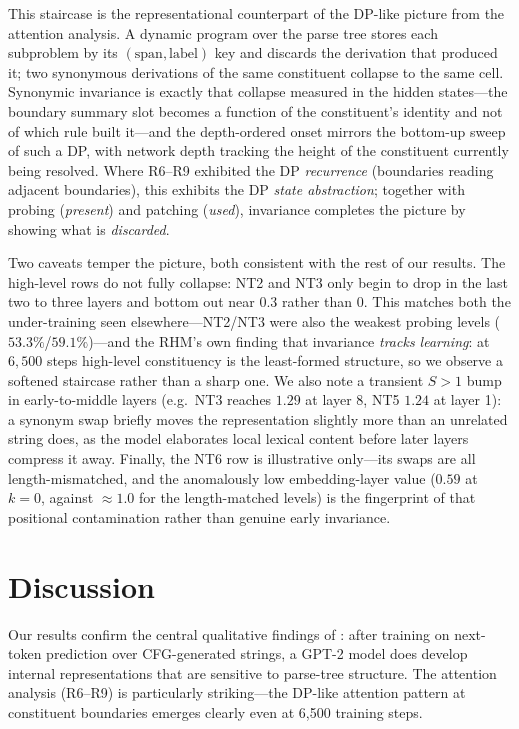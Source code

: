 \documentclass[10pt,twocolumn]{article}
\begin{document}
This staircase is the representational counterpart of the DP-like picture from the attention analysis. A dynamic program over the parse tree stores each subproblem by its $(\text{span},\text{label})$ key and discards the derivation that produced it; two synonymous derivations of the same constituent collapse to the same cell. Synonymic invariance is exactly that collapse measured in the hidden states---the boundary summary slot becomes a function of the constituent's identity and not of which rule built it---and the depth-ordered onset mirrors the bottom-up sweep of such a DP, with network depth tracking the height of the constituent currently being resolved. Where R6--R9 exhibited the DP \emph{recurrence} (boundaries reading adjacent boundaries), this exhibits the DP \emph{state abstraction}; together with probing (\emph{present}) and patching (\emph{used}), invariance completes the picture by showing what is \emph{discarded}.

Two caveats temper the picture, both consistent with the rest of our results. The high-level rows do not fully collapse: NT2 and NT3 only begin to drop in the last two to three layers and bottom out near $0.3$ rather than $0$. This matches both the under-training seen elsewhere---NT2/NT3 were also the weakest probing levels ($53.3\%$/$59.1\%$)---and the RHM's own finding that invariance \emph{tracks learning}: at $6{,}500$ steps high-level constituency is the least-formed structure, so we observe a softened staircase rather than a sharp one. We also note a transient $S>1$ bump in early-to-middle layers (e.g.\ NT3 reaches $1.29$ at layer 8, NT5 $1.24$ at layer 1): a synonym swap briefly moves the representation slightly more than an unrelated string does, as the model elaborates local lexical content before later layers compress it away. Finally, the NT6 row is illustrative only---its swaps are all length-mismatched, and the anomalously low embedding-layer value ($0.59$ at $k{=}0$, against ${\approx}1.0$ for the length-matched levels) is the fingerprint of that positional contamination rather than genuine early invariance.

\section{Discussion}
\label{sec:discussion}

Our results confirm the central qualitative findings of \citet{allen-zhu2023physics}: after training on next-token prediction over CFG-generated strings, a GPT-2 model does develop internal representations that are sensitive to parse-tree structure. The attention analysis (R6--R9) is particularly striking—the DP-like attention pattern at constituent boundaries emerges clearly even at 6{,}500 training steps.
\end{document}
